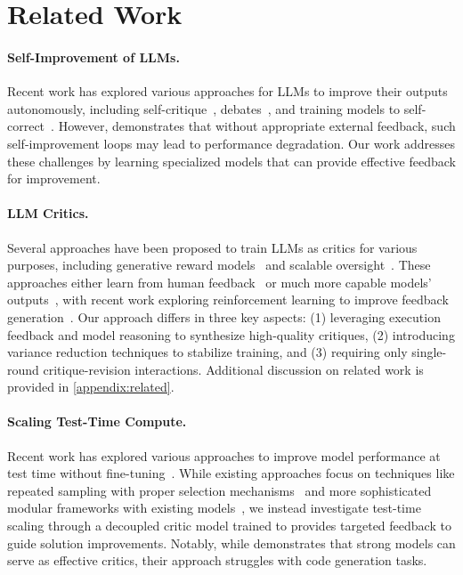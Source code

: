 \section{Related Work}
\paragraph{Self-Improvement of LLMs.}
Recent work has explored various approaches for LLMs to improve their outputs autonomously, including self-critique~\cite{madaan2024self,shinn2024reflexion}, debates~\cite{irving2018ai,michael2023debate,khan2024debating}, and training models to self-correct~\cite{welleck2022generating,kumar2024training}. However, \citet{huang2023large} demonstrates that without appropriate external feedback, such self-improvement loops may lead to performance degradation.  Our work addresses these challenges by learning specialized models that can provide effective feedback for improvement.

\paragraph{LLM Critics.}
Several approaches have been proposed to train LLMs as critics for various purposes, including generative reward models~\cite{ankner2024critique,xiong2024llava} and scalable oversight~\cite{saunders2022self,kenton2024scalable}.
These approaches either learn from human feedback~\cite{wang2023shepherd,mcaleese2024llm} or much more capable models' outputs~\cite{xi2024enhancing}, with recent work exploring reinforcement learning to improve feedback generation~\cite{akyurek2023rl4f,yao2023retroformer}.
Our approach differs in three key aspects: (1) leveraging execution feedback and model reasoning to synthesize high-quality critiques, (2) introducing variance reduction techniques to stabilize training, and (3) requiring only single-round critique-revision interactions.
Additional discussion on related work is provided in \cref{appendix:related}.



\paragraph{Scaling Test-Time Compute.}
Recent work has explored various approaches to improve model performance at test time without fine-tuning~\cite{snell2024scaling}. While existing approaches focus on techniques like repeated sampling with proper selection mechanisms~\cite{brown2024large} and more sophisticated modular frameworks with existing models~\cite{saad2024archon}, we instead investigate test-time scaling through a decoupled critic model trained to provides targeted feedback to guide solution improvements.
Notably, while \citet{saad2024archon} demonstrates that strong models can serve as effective critics, their approach struggles with code generation tasks.





